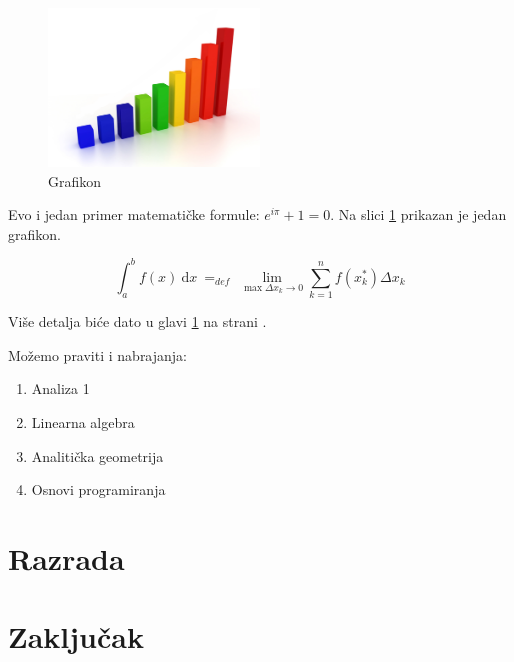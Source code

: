 \documentclass[a4paper,12pt,oneside]{memoir}
\begin{document}
\begin{figure}[!ht]
  \centering
  \label{fig:grafikon}
  \includegraphics[width=0.5\textwidth]{graph.png}
  \caption{Grafikon}
\end{figure}


Evo i jedan primer matematičke formule: $e^{i\pi} + 1 = 0$. 
Na slici \ref{fig:grafikon} prikazan je jedan grafikon.

$$
\int_a^b f(x)\ \mathrm{d}x \ =_{def}\ \lim_{\max{\Delta x_k \rightarrow 0}} \sum_{k=1}^n f(x_k^*)\Delta x_k
$$

Više detalja biće dato u glavi \ref{chp:razrada} na strani \pageref{chp:razrada}.

Možemo praviti i nabrajanja:
\begin{enumerate}
\item Analiza 1
\item Linearna algebra
\item Analitička geometrija
\item Osnovi programiranja
\end{enumerate}

\pangrami

\chapter{Razrada}
\label{chp:razrada}


\pangrami

\pangrami

\chapter{Zaključak}
\pangrami
\end{document}
